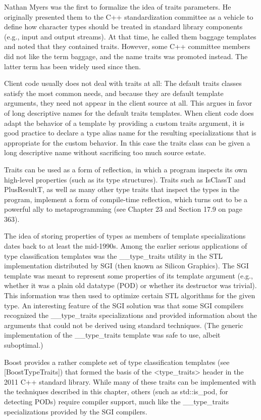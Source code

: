 Nathan Myers was the first to formalize the idea of traits parameters. He originally presented them to the C++ standardization committee as a vehicle to define how character types should be treated in standard library components (e.g., input and output streams). At that time, he called them baggage templates and noted that they contained traits. However, some C++ committee members did not like the term baggage, and the name traits was promoted instead. The latter term has been widely used since then.

Client code usually does not deal with traits at all: The default traits classes satisfy the most common needs, and because they are default template arguments, they need not appear in the client source at all. This argues in favor of long descriptive names for the default traits templates. When client code does adapt the behavior of a template by providing a custom traits argument, it is good practice to declare a type alias name for the resulting specializations that is appropriate for the custom behavior. In this case the traits class can be given a long descriptive name without sacrificing too much source estate.

Traits can be used as a form of reflection, in which a program inspects its own high-level properties (such as its type structures). Traits such as IsClassT and PlusResultT, as well as many other type traits that inspect the types in the program, implement a form of compile-time reflection, which turns out to be a powerful ally to metaprogramming (see Chapter 23 and Section 17.9 on page 363).

The idea of storing properties of types as members of template specializations dates back to at least the mid-1990s. Among the earlier serious applications of type classification templates was the \_\_type\_traits utility in the STL implementation distributed by SGI (then known as Silicon Graphics). The SGI template was meant to represent some properties of its template argument (e.g., whether it was a plain old datatype (POD) or whether its destructor was trivial). This information was then used to optimize certain STL algorithms for the given type. An interesting feature of the SGI solution was that some SGI compilers recognized the \_\_type\_traits specializations and provided information about the arguments that could not be derived using standard techniques. (The generic implementation of the \_\_type\_traits template was safe to use, albeit suboptimal.)

Boost provides a rather complete set of type classification templates (see [BoostTypeTraits]) that formed the basis of the <type\_traits> header in the 2011 C++ standard library. While many of these traits can be implemented with the techniques described in this chapter, others (such as std::is\_pod, for detecting PODs) require compiler support, much like the \_\_type\_traits specializations provided by the SGI compilers.


